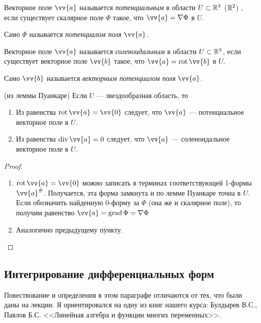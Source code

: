 \begin{definition}
	Векторное поле $\vv{a}$ называется \textit{потенциальным} в области $U \subset \mathbb{R}^3$ ($\mathbb{R}^2$) , если существует скалярное поле $\Phi$ такое, что $\vv{a} = \nabla \Phi$ в $U$.
	
	Само $\Phi$ называется \textit{потенциалом поля} $\vv{a}$.
\end{definition}

\begin{definition}
	Векторное поле $\vv{a}$ называется \textit{соленоидальным} в области $U \subset \mathbb{R}^3$, если существует векторное поле $\vv{b}$ такое, что $\vv{a} = \rot \vv{b}$ в $U$.
	
	Само $\vv{b}$ называется \textit{векторным потенциалом поля} $\vv{a}$.
\end{definition}

\begin{corollary} (из леммы Пуанкаре)
	Если $U$ --- звездообразная область, то
	\begin{enumerate}
		\item Из равенства $\rot \vv{a} = \vv{0}$ следует, что $\vv{a}$ --- потенциальное векторное поле в $U$.
		
		\item Из равенства $\Div \vv{a} = 0$ следует, что $\vv{a}$ --- соленоидальное векторное поле в $U$.
	\end{enumerate}
\end{corollary}

\begin{proof}~
	\begin{enumerate}
		\item $\rot \vv{a} = \vv{0}$ можно записать в терминах соответствующей 1-формы $\vv{a}^\#$. Получается, эта форма замкнута и по лемме Пуанкаре точна в $U$. Если обозначить найденную 0-форму за $\Phi$ (она же и скалярное поле), то получим равенство $\vv{a} = \grad \Phi = \nabla \Phi$
		
		\item Аналогично предыдущему пункту.
	\end{enumerate}
\end{proof}

\subsection{Интегрирование дифференциальных форм}

\begin{anote}
	Повествование и определения в этом параграфе отличаются от тех, что были даны на лекции. Я ориентировался на одну из книг нашего курса: Булдырев В.С., Павлов Б.С. <<Линейная алгебра и функции многих переменных>>.
\end{anote}

